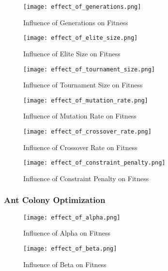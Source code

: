 \documentclass{article}
\begin{document}
\begin{figure}[H]
    \centering
    \texttt{[image: effect\_of\_generations.png]}
    \caption{Influence of Generations on Fitness}
    \label{fig:generations}
\end{figure}

\begin{figure}[H]
    \centering
    \texttt{[image: effect\_of\_elite\_size.png]}
    \caption{Influence of Elite Size on Fitness}
    \label{fig:elite_size}
\end{figure}

\begin{figure}[H]
    \centering
    \texttt{[image: effect\_of\_tournament\_size.png]}
    \caption{Influence of Tournament Size on Fitness}
    \label{fig:tournament_size}
\end{figure}

\begin{figure}[H]
    \centering
    \texttt{[image: effect\_of\_mutation\_rate.png]}
    \caption{Influence of Mutation Rate on Fitness}
    \label{fig:mutation_rate}
\end{figure}

\begin{figure}[H]
    \centering
    \texttt{[image: effect\_of\_crossover\_rate.png]}
    \caption{Influence of Crossover Rate on Fitness}
    \label{fig:crossover_rate}
\end{figure}

\begin{figure}[H]
    \centering
    \texttt{[image: effect\_of\_constraint\_penalty.png]}
    \caption{Influence of Constraint Penalty on Fitness}
    \label{fig:constraint_penalty}
\end{figure}

\subsubsection{Ant Colony Optimization}
\begin{figure}[H]
    \centering
    \texttt{[image: effect\_of\_alpha.png]}
    \caption{Influence of Alpha on Fitness}
    \label{fig:alpha}
\end{figure}

\begin{figure}[H]
    \centering
    \texttt{[image: effect\_of\_beta.png]}
    \caption{Influence of Beta on Fitness}
    \label{fig:beta}
\end{figure}
\end{document}
